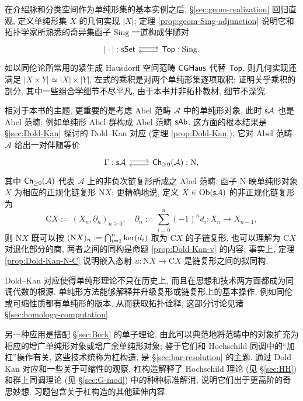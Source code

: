 在介绍脉和分类空间作为单纯形集的基本实例之后, \S\ref{sec:geom-realization} 回归直观, 定义单纯形集 $X$ 的几何实现 $|X|$; 定理 \ref{prop:geom-Sing-adjunction} 说明它和拓扑学家所熟悉的奇异集函子 $\mathrm{Sing}$ 一道构成伴随对
\[\begin{tikzcd}
	{|\cdot|}: \cate{sSet} \arrow[shift left, r] & \cate{Top} : \mathrm{Sing}. \arrow[shift left, l]
\end{tikzcd}\]
如以同伦论所常用的紧生成 Hausdorff 空间范畴 $\mathsf{CGHaus}$ 代替 $\mathsf{Top}$, 则几何实现还满足 $|X \times Y| \simeq |X| \times |Y|$, 左式的乘积是对两个单纯形集逐项取积; 证明关乎乘积的剖分, 其中一些组合学细节不尽平凡, 由于本书并非拓扑教材, 细节不深究.

相对于本书的主题, 更重要的是考虑 Abel 范畴 $\mathcal{A}$ 中的单纯形对象, 此时 $\mathsf{s}\mathcal{A}$ 也是 Abel 范畴; 例如单纯形 Abel 群构成 Abel 范畴 $\mathsf{sAb}$. 这方面的根本结果是 \S\ref{sec:Dold-Kan} 探讨的 Dold--Kan 对应 (定理 \ref{prop:Dold-Kan}), 它对 Abel 范畴 $\mathcal{A}$ 给出一对伴随等价
\[\begin{tikzcd}
	\Gamma: \cate{s}\mathcal{A} \arrow[shift left, r] & \cate{Ch}_{\geq 0}(\mathcal{A}): \mathrm{N}, \arrow[shift left, l]
\end{tikzcd}\]
其中 $\mathsf{Ch}_{\geq 0}(\mathcal{A})$ 代表 $\mathcal{A}$ 上的非负次链复形所成之 Abel 范畴. 函子 $\mathrm{N}$ 映单纯形对象 $X$ 为相应的正规化链复形 $\mathrm{N}X$; 更精确地说, 定义 $X \in \operatorname{Ob}(\mathsf{s}\mathcal{A})$ 的非正规化链复形为
\[ \mathrm{C}X := \left( X_n, \partial_n\right)_{n \geq 0}, \quad \partial_n := \sum_{i=0}^n (-1)^n d_i : X_n \to X_{n-1}, \]
则 $\mathrm{N}X$ 既可以按 $(\mathrm{N}X)_n := \bigcap_{i=1}^n \operatorname{ker}(d_i)$ 取为 $\mathrm{C}X$ 的子链复形, 也可以理解为 $\mathrm{C}X$ 对退化部分的商, 两者之间的同构是命题 \ref{prop:Dold-Kan-v} 的内容; 事实上, 定理 \ref{prop:Dold-Kan-N-C} 说明嵌入态射 $u: \mathrm{N}X \to \mathrm{C}X$ 是链复形之间的拟同构.

Dold--Kan 对应使得单纯形理论不只在历史上, 而且在思想和技术两方面都成为同调代数的根源. 单纯形方法能够解释并升级复形或链复形上的基本操作, 例如同伦或可缩性质都有单纯形的版本, 从而获取拓扑诠释, 这部分讨论见诸 \S\ref{sec:homology-computation}.

另一种应用是搭配 \S\ref{sec:Beck} 的单子理论, 由此可以典范地将范畴中的对象扩充为相应的增广单纯形对象或增广余单纯形对象; 鉴于它们和 Hochschild 同调中的``加杠''操作有关, 这些技术统称为杠构造, 是 \S\ref{sec:bar-resolution} 的主题. 通过 Dold--Kan 对应和一些关于可缩性的观察, 杠构造解释了 Hochschild 理论 (见 \S\ref{sec:HH}) 和群上同调理论 (见 \S\ref{sec:G-mod}) 中的种种标准解消, 说明它们出于更高阶的奇思妙想. 习题包含关于杠构造的其他延伸内容.

